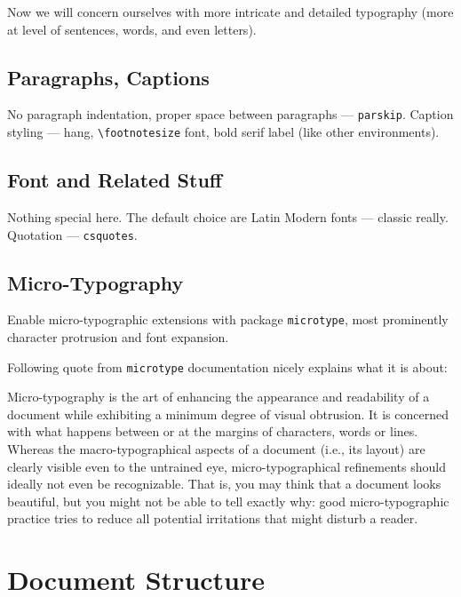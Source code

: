 Now we will concern ourselves with more intricate and detailed typography (more at level of sentences, words, and even letters).

\subsection{Paragraphs, Captions}%
\label{sub:Paragraphs}

No paragraph indentation, proper space between paragraphs --- \texttt{parskip}.
Caption styling --- hang, \verb|\footnotesize| font, bold serif label (like other environments).

\subsection{Font and Related Stuff}%
\label{sub:Font}

Nothing special here.
The default choice are Latin Modern fonts --- classic really.
Quotation --- \texttt{csquotes}.

\subsection{Micro-Typography}%
\label{sub:Micro-Typography}

Enable micro-typographic extensions with package \texttt{microtype}, most prominently character protrusion and font expansion.

Following quote from \texttt{microtype} documentation nicely explains what it is about:
\begin{displayquote}
    Micro-typography is the art of enhancing the appearance and readability of a
    document while exhibiting a minimum degree of visual obtrusion.
    It is concerned with what happens between or at the margins of characters, words or lines.
    Whereas the macro-typographical aspects of a document (i.e., its layout) are clearly visible even to the untrained eye, micro-typographical refinements should ideally not even be recognizable.
    That is, you may think that a document looks beautiful, but you might not be able to tell exactly why: good micro-typographic practice tries to reduce all potential irritations that might disturb a reader.
\end{displayquote}


\section{Document Structure}%
\label{sec:Document Structure}

